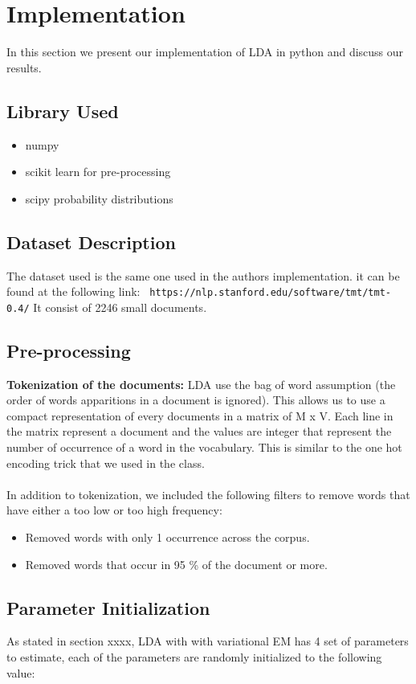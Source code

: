 \documentclass[11pt]{article}
\begin{document}
\section{Implementation}
In this section we present our implementation of LDA in python and discuss our results.
\subsection{Library Used}
	
    \begin{itemize}[noitemsep]
		\item numpy
		\item scikit learn for pre-processing
		\item scipy probability distributions
 	\end{itemize}
\subsection{Dataset Description}
The dataset used is the same one used in the authors implementation. it can be found at the following link: \texttt{ https://nlp.stanford.edu/software/tmt/tmt-0.4/}
It consist of 2246 small documents. 
   
\subsection{Pre-processing}
\textbf{Tokenization of the documents:}  LDA use the bag of word assumption (the order of words apparitions in a document is ignored). This allows us to use a compact representation of every documents in a matrix of M x V.  Each line in the matrix represent a document and the values are integer that represent the number of occurrence of a word in the vocabulary. This is similar to the one hot encoding trick that we used in the class. \\
\\
In addition  to tokenization, we included the following filters to remove words that have either a too low or too high frequency: 
    \begin{itemize}[noitemsep]
		\item Removed  words with only 1 occurrence across the corpus.
		\item Removed words that occur in 95 \% of the document or more. 
	\end{itemize}
\subsection{Parameter Initialization}
As stated in section xxxx, LDA with with variational EM has 4 set of parameters to estimate, each  of the parameters are randomly initialized to the following value:
\end{document}
